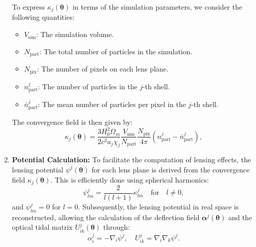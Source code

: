 \begin{enumerate}
    To express $\kappa_j(\boldsymbol{\theta})$ in terms of the simulation parameters, we consider the following quantities:
    \begin{itemize}
        \item $V_{\mathrm{sim}}$: The simulation volume.
        \item $N_{\mathrm{part}}$: The total number of particles in the simulation.
        \item $N_{\mathrm{pix}}$: The number of pixels on each lens plane.
        \item $n_{\mathrm{part}}^j$: The number of particles in the $j$-th shell.
        \item $\bar{n}_{\mathrm{part}}^j$: The mean number of particles per pixel in the $j$-th shell.
    \end{itemize}
    The convergence field is then given by:
    \begin{equation}
        \kappa_j(\boldsymbol{\theta}) = \frac{3H_0^2\Omega_m}{2c^2 a_j \chi_j} \frac{V_{\mathrm{sim}}}{N_{\mathrm{part}}} \frac{N_{\mathrm{pix}}}{4\pi} \left( n_{\mathrm{part}}^j - \bar{n}_{\mathrm{part}}^j \right),
    \end{equation}

    \item \textbf{Potential Calculation:} 
    To facilitate the computation of lensing effects, the lensing potential $\psi^j(\boldsymbol{\theta})$ for each lens plane is derived from the convergence field $\kappa_j(\boldsymbol{\theta})$. This is efficiently done using spherical harmonics:
    \begin{equation}
        \psi_{lm}^j = \frac{2}{l(l+1)} \kappa_{lm}^j \quad \text{for} \quad l \neq 0,
    \end{equation}
    and $\psi_{lm}^j = 0$ for $l = 0$. Subsequently, the lensing potential in real space is reconstructed, allowing the calculation of the deflection field $\boldsymbol{\alpha}^j(\boldsymbol{\theta})$ and the optical tidal matrix $U_{ik}^j(\boldsymbol{\theta})$ through:
    \begin{equation}
        \alpha_i^j = -\nabla_i \psi^j, \quad U_{ik}^j = \nabla_i \nabla_k \psi^j.
    \end{equation}


\end{enumerate}

